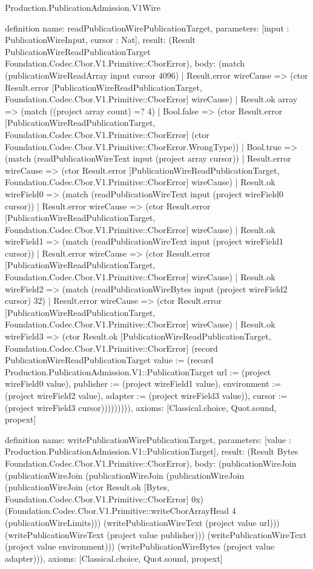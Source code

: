 \begin{lexlean}{Production.PublicationAdmission.V1Wire}
\begin{semanticmodule}
definition{
  name: readPublicationWirePublicationTarget,
  parameters: [input : PublicationWireInput, cursor : Nat],
  result: (Result PublicationWireReadPublicationTarget Foundation.Codec.Cbor.V1.Primitive::CborError),
  body: (match (publicationWireReadArray input cursor 4096)
    | Result.error wireCause => (ctor Result.error [PublicationWireReadPublicationTarget, Foundation.Codec.Cbor.V1.Primitive::CborError] wireCause)
    | Result.ok array => (match ((project array count) =? 4)
      | Bool.false => (ctor Result.error [PublicationWireReadPublicationTarget, Foundation.Codec.Cbor.V1.Primitive::CborError] (ctor Foundation.Codec.Cbor.V1.Primitive::CborError.WrongType))
      | Bool.true => (match (readPublicationWireText input (project array cursor))
        | Result.error wireCause => (ctor Result.error [PublicationWireReadPublicationTarget, Foundation.Codec.Cbor.V1.Primitive::CborError] wireCause)
        | Result.ok wireField0 => (match (readPublicationWireText input (project wireField0 cursor))
          | Result.error wireCause => (ctor Result.error [PublicationWireReadPublicationTarget, Foundation.Codec.Cbor.V1.Primitive::CborError] wireCause)
          | Result.ok wireField1 => (match (readPublicationWireText input (project wireField1 cursor))
            | Result.error wireCause => (ctor Result.error [PublicationWireReadPublicationTarget, Foundation.Codec.Cbor.V1.Primitive::CborError] wireCause)
            | Result.ok wireField2 => (match (readPublicationWireBytes input (project wireField2 cursor) 32)
              | Result.error wireCause => (ctor Result.error [PublicationWireReadPublicationTarget, Foundation.Codec.Cbor.V1.Primitive::CborError] wireCause)
              | Result.ok wireField3 => (ctor Result.ok [PublicationWireReadPublicationTarget, Foundation.Codec.Cbor.V1.Primitive::CborError] (record PublicationWireReadPublicationTarget {value := (record Production.PublicationAdmission.V1::PublicationTarget {url := (project wireField0 value), publisher := (project wireField1 value), environment := (project wireField2 value), adapter := (project wireField3 value)}), cursor := (project wireField3 cursor)})))))))),
  axioms: [Classical.choice, Quot.sound, propext]
}

definition{
  name: writePublicationWirePublicationTarget,
  parameters: [value : Production.PublicationAdmission.V1::PublicationTarget],
  result: (Result Bytes Foundation.Codec.Cbor.V1.Primitive::CborError),
  body: (publicationWireJoin (publicationWireJoin (publicationWireJoin (publicationWireJoin (publicationWireJoin (ctor Result.ok [Bytes, Foundation.Codec.Cbor.V1.Primitive::CborError] 0x) (Foundation.Codec.Cbor.V1.Primitive::writeCborArrayHead 4 (publicationWireLimits))) (writePublicationWireText (project value url))) (writePublicationWireText (project value publisher))) (writePublicationWireText (project value environment))) (writePublicationWireBytes (project value adapter))),
  axioms: [Classical.choice, Quot.sound, propext]
}


\end{semanticmodule}
\end{lexlean}
